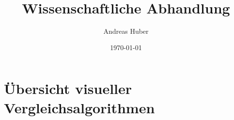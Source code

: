\documentclass[a4paper,12pt]{article}
\title{Wissenschaftliche Abhandlung}
\author{Andreas Huber}
\date{\today}
\begin{document}

\newpage




\newpage
\tableofcontents

\newpage


\newpage
{}



\newpage
\section{Übersicht visueller Vergleichsalgorithmen}
















\newpage


\newpage


% 
\end{document}
